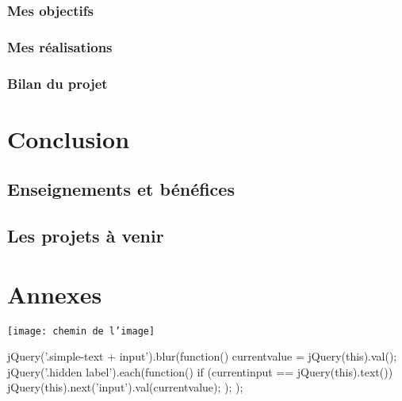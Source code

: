 \documentclass[a4paper,11pt,twoside]{report}
\begin{document}
    \subsection*{Mes objectifs}
    \subsection*{Mes réalisations}
    \subsection*{Bilan du projet}
    

\chapter{Conclusion}
  \section{Enseignements et bénéfices}
  \section{Les projets à venir}

\chapter*{Annexes}

\listoffigures



\texttt{[image: chemin de l'image]}

\begin{verbatimtab}[4] 
jQuery('.simple-text + input').blur(function(){
            currentvalue = jQuery(this).val();
            jQuery('.hidden label').each(function() {
                if (currentinput == jQuery(this).text()) {
                    jQuery(this).next('input').val(currentvalue);
                }
            });
        });
\end{verbatimtab}
\end{document}
